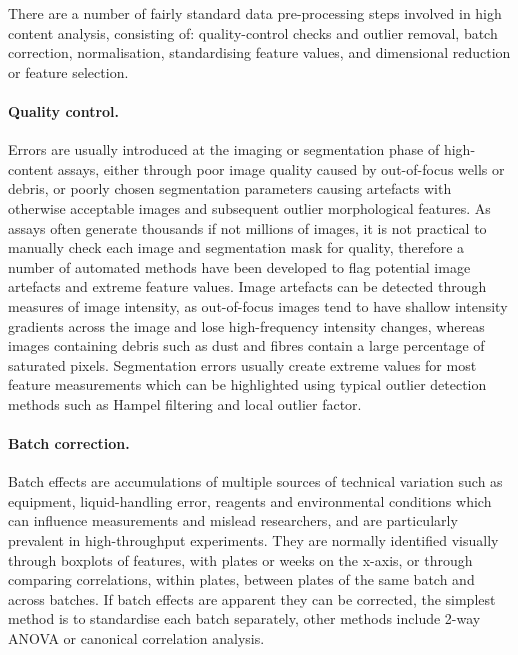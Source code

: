\documentclass[a4paper,11pt,twoside,openright]{scrbook}
\begin{document}
There are a number of fairly standard data pre-processing steps involved in high content analysis, consisting of: 
quality-control checks and outlier removal, batch correction, normalisation, standardising feature values, and 
dimensional reduction or feature selection. \cite{Caicedo2017}


\paragraph{Quality control.}
Errors are usually introduced at the imaging or segmentation phase of high-content assays, either through poor image 
quality caused by out-of-focus wells or debris, or poorly chosen segmentation parameters causing artefacts with 
otherwise acceptable images and subsequent outlier morphological features.
As assays often generate thousands if not millions of images, it is not practical to manually check each image and 
segmentation mask for quality, therefore a number of automated methods have been developed to flag potential image 
artefacts and extreme feature values.
Image artefacts can be detected through measures of image intensity, as out-of-focus images tend to have shallow 
intensity gradients across the image and lose high-frequency intensity changes, \cite{Bray2012} whereas images 
containing debris such as dust and fibres contain a large percentage of saturated pixels.
Segmentation errors usually create extreme values for most feature measurements which can be highlighted using typical 
outlier detection methods such as Hampel filtering \cite{Hampel1974} and local outlier factor. \cite{Breunig2000}

\paragraph{Batch correction.}
Batch effects are accumulations of multiple sources of technical variation such as equipment, liquid-handling error, 
reagents and environmental conditions which can influence measurements and mislead researchers, and are particularly 
prevalent in high-throughput experiments.
They are normally identified visually through boxplots of features, with plates or weeks on the x-axis, or through 
comparing correlations, within plates, between plates of the same batch and across batches.
If batch effects are apparent they can be corrected, the simplest method is to standardise each batch separately, other 
methods include 2-way ANOVA \cite{Nygaard2016} or canonical correlation analysis. \cite{Vaisipour2014}
\end{document}
